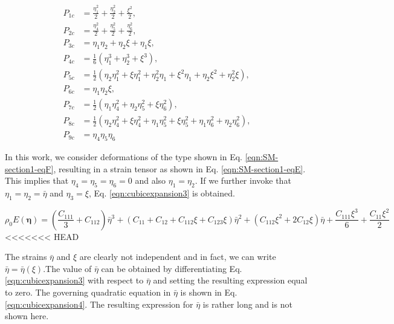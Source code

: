 \documentclass[showpacs,aps,floatfix,prb,reprint,superscriptaddress,onecolumn]{revtex4-1}
\begin{document}
\begin{subequations}
\label{eqn:expansioncubic2detailed} 
\begin{align}
        P_{1c} &=\frac{\eta_{1}^2}{2}  + \frac{\eta_{2}^2}{2} + \frac{\xi^2}{2} ,\\
        P_{2c} &=\frac{\eta_{4}^2}{2} + \frac{\eta_{5}^2}{2} + \frac{\eta_{6}^2}{2} ,\\
				P_{3c} &=\eta_{1}\eta_{2} + \eta_{2}\xi + \eta_{1}\xi,\\
				P_{4c} &=\frac{1}{6} \left(\eta_{1}^{3}+\eta_{2}^{3}+\xi^{3} \right) ,\\
				P_{5c} &=\frac{1}{2} \left(\eta_{2}\eta_{1}^{2} + \xi\eta_{1}^{2} + \eta_{2}^{2}\eta_{1} + \xi^{2}\eta_{1} + \eta_{2}\xi^{2} + \eta_{2}^{2}\xi \right)  ,\\
				P_{6c} &=\eta_{1}\eta_{2}\xi  ,\\
				P_{7c} &=\frac{1}{2} \left(\eta_{1}\eta_{4}^2 + \eta_{2}\eta_{5}^{2} + \xi\eta_{6}^{2}\right)  ,\\
				P_{8c} &=\frac{1}{2} \left(\eta_{2}\eta_{4}^2 + \xi\eta_{4}^{2} + \eta_{1}\eta_{5}^{2} + \xi\eta_{5}^{2}  + \eta_{1}\eta_{6}^{2}  +  \eta_{2}\eta_{6}^{2} \right) ,\\
				P_{9c} &=\eta_{4}\eta_{5}\eta_{6}  
\end{align}
\end{subequations}

In this work, we consider deformations of the type shown in Eq. \ref{eqn:SM-section1-eqF}, resulting in a strain tensor as shown in Eq. \ref{eqn:SM-section1-eqE}. This implies that $\eta_{4} = \eta_{5} = \eta_{6} = 0$ and also $\eta_{1} = \eta_{2}$. If we further invoke that $\eta_{1} = \eta_{2} = \bar{\eta}$ and $\eta_{3} = \xi$, Eq. \ref{eqn:cubicexpansion3} is obtained. 

\begin{equation}
\label{eqn:cubicexpansion3} 
\rho_{0} E \left(\bm{\eta}\right) = \left(\frac{C_{111}}{3} + C_{112}\right) \bar{\eta}^{3} + 
\left(C_{11} + C_{12} + C_{112} \xi + C_{123} \xi \right) \bar{\eta}^{2} + 
\left(C_{112} \xi^{2} + 2 C_{12} \xi \right) \bar{\eta} + 
\frac{C_{111} \xi^{3}}{6} + \frac{C_{11} \xi^{2}}{2}
\end{equation}
<<<<<<< HEAD

The strains $\bar{\eta}$ and $\xi$ are clearly not independent and in fact, we can write $\bar{\eta} = \bar{\eta} \left(\xi\right)$.The value of $\bar{\eta}$ can be obtained by differentiating Eq. \ref{eqn:cubicexpansion3} with respect to $\bar{\eta}$ and setting the resulting expression equal to zero. The governing quadratic equation in $\bar{\eta}$ is shown in Eq. \ref{eqn:cubicexpansion4}. The resulting expression for $\bar{\eta}$ is rather long and is not shown here. 
\end{document}
